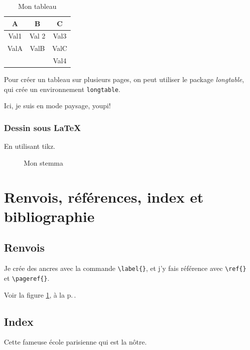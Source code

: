 \documentclass[12pt,a4paper]{book} %
\begin{document}
\begin{table}[!h]
\centering
\begin{tabular}{c|c|c}
\hline
A & B & C \\ \hline \hline %
Val1 & Val 2 & Val3 \\
ValA & ValB & ValC\\
&&Val4 \\ \hline
\end{tabular}
\caption{Mon tableau}
\end{table}

Pour créer un tableau sur plusieurs pages, on peut utiliser le package \textit{longtable}, qui crée un environnement \verb=longtable=.


\begin{landscape}
Ici, je suis en mode paysage, youpi!
\end{landscape}

\subsection{Dessin sous \LaTeX{}}

En utilisant tikz.

\begin{figure}
\caption{Mon stemma}
\label{figure:stemma}
\end{figure}

\chapter{Renvois, références, index et bibliographie}

\section{Renvois}

Je crée des ancres avec la commande \verb=\label{}=, et j'y fais référence avec \verb=\ref{}= et \verb=\pageref{}=.

Voir la figure \ref{figure:stemma}, à la p.\,\pageref{figure:stemma}.

\section{Index}
Cette fameuse école parisienne qui est la nôtre.
\end{document}
